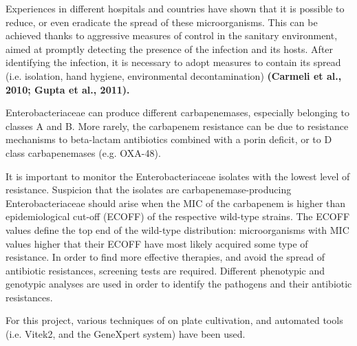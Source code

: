 \documentclass[11pt]{report}
\begin{document}
Experiences in different hospitals and countries have shown that it is possible to reduce, or even eradicate the spread of these microorganisms.
This can be achieved thanks to aggressive measures of control in the sanitary environment, aimed at promptly detecting the presence of the infection and its hosts.
After identifying the infection, it is necessary to adopt measures to contain its spread (i.e. isolation, hand hygiene, environmental decontamination) \textbf{(Carmeli et al., 2010; Gupta et al., 2011).}

Enterobacteriaceae can produce different carbapenemases, especially belonging to classes A and B.
More rarely, the carbapenem resistance can be due to resistance mechanisms to beta-lactam antibiotics combined with a porin deficit, or to D class carbapenemases (e.g. OXA-48).

It is important to monitor the Enterobacteriaceae isolates with the lowest level of resistance.
Suspicion that the isolates are carbapenemase-producing Enterobacteriaceae should arise when the MIC of the carbapenem is higher than epidemiological cut-off (ECOFF) of the respective wild-type strains.
The ECOFF values define the top end of the wild-type distribution: microorganisms with MIC values higher that their ECOFF have most likely acquired some type of resistance.
In order to find more effective therapies, and avoid the spread of antibiotic resistances, screening tests are required.
Different phenotypic and genotypic analyses are used in order to identify the pathogens and their antibiotic resistances.

For this project, various techniques of on plate cultivation, and automated tools (i.e. Vitek2, and the GeneXpert system) have been used.
\end{document}
